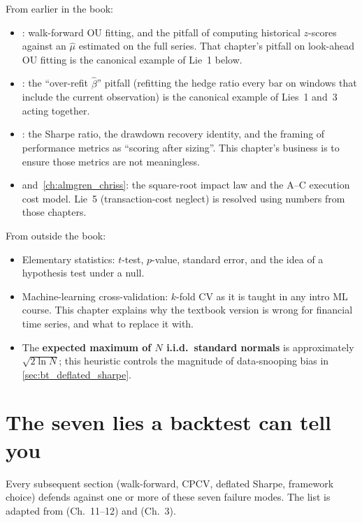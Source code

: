 \begin{backgroundbox}[Prerequisites]
From earlier in the book:
\begin{itemize}
  \item {}: walk-forward OU fitting, and
  the pitfall of computing historical $z$-scores against an
  $\hat\mu$ estimated on the full series. That chapter's
  pitfall on look-ahead OU fitting is the canonical example of
  Lie~1 below.
  \item {}: the ``over-refit
  $\hat\beta$'' pitfall (refitting the hedge ratio every bar
  on windows that include the current observation) is the
  canonical example of Lies~1 and~3 acting together.
  \item {}: the Sharpe ratio, the drawdown
  recovery identity, and the framing of performance metrics as
  ``scoring after sizing''. This chapter's business is to ensure
  those metrics are not meaningless.
  \item {} and~\cref{ch:almgren_chriss}:
  the square-root impact law and the A--C execution cost model.
  Lie~5 (transaction-cost neglect) is resolved using numbers
  from those chapters.
\end{itemize}
From outside the book:
\begin{itemize}
  \item Elementary statistics: $t$-test, $p$-value, standard
  error, and the idea of a hypothesis test under a null.
  \item Machine-learning cross-validation: $k$-fold CV as it is
  taught in any intro ML course. This chapter explains why the
  textbook version is wrong for financial time series, and
  what to replace it with.
  \item The \textbf{expected maximum of $N$ i.i.d.\ standard
  normals} is approximately $\sqrt{2 \ln N}$; this heuristic
  controls the magnitude of data-snooping bias in
  \cref{sec:bt_deflated_sharpe}.
\end{itemize}
\end{backgroundbox}

\section{The seven lies a backtest can tell you}
\label{sec:bt_seven_lies}

Every subsequent section (walk-forward, CPCV, deflated Sharpe,
framework choice) defends against one or more of these seven
failure modes. The list is adapted from \citet{lopezdeprado2018afml}
(Ch.~11--12) and \citet{chan2013algorithmic} (Ch.~3).

